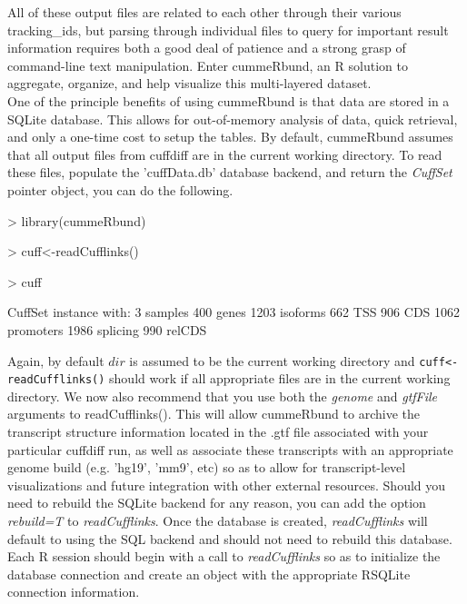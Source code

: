 \documentclass[10pt]{article}
\newcommand{\code}[1]{{\texttt{#1}}}
\newcommand{\Rclass}[1]{{\textit{#1}}}
\newcommand{\Rmethod}[1]{{\textit{#1}}}
\newcommand{\Rfunarg}[1]{{\textit{#1}}}
\begin{document}
All of these output files are related to each other through their various tracking\_ids, but parsing through individual files to query for important result information requires both a good deal of patience and a strong grasp of command-line text manipulation. Enter cummeRbund, an R solution to aggregate, organize, and help visualize this multi-layered dataset. \\
One of the principle benefits of using cummeRbund is that data are stored in a SQLite database.  This allows for out-of-memory analysis of data, quick retrieval, and only a one-time cost to setup the tables. By default, cummeRbund assumes that all output files from cuffdiff are in the current working directory.
To read these files, populate the 'cuffData.db' database backend, and return the \Rclass{CuffSet} pointer object, you can do the following. 

\begin{Schunk}
\begin{Sinput}
> library(cummeRbund)
\end{Sinput}
\end{Schunk}

\begin{Schunk}
\begin{Sinput}
> cuff<-readCufflinks()
\end{Sinput}
\end{Schunk}

\begin{Schunk}
\begin{Sinput}
> cuff
\end{Sinput}
\begin{Soutput}
CuffSet instance with:
	 3 samples
	 400 genes
	 1203 isoforms
	 662 TSS
	 906 CDS
	 1062 promoters
	 1986 splicing
	 990 relCDS
\end{Soutput}
\end{Schunk}

Again, by default $dir$ is assumed to be the current working directory and \code{cuff<-readCufflinks()} should work if all appropriate files are in the current working directory. We now also
recommend that you use both the \Rfunarg{genome} and \Rfunarg{gtfFile} arguments to readCufflinks(). This will allow cummeRbund to archive the transcript structure information located in the .gtf file associated with
your particular cuffdiff run, as well as associate these transcripts with an appropriate genome build (e.g. 'hg19', 'mm9', etc) so as to allow for transcript-level visualizations and future integration with other external resources. 
Should you need to rebuild the SQLite backend for any reason, you can add the option \Rfunarg{rebuild=T} to \Rmethod{readCufflinks}.  Once the database is created, \Rmethod{readCufflinks} will default to using the SQL backend and should not need to rebuild this database.
Each R session should begin with a call to \Rmethod{readCufflinks} so as to initialize the database connection and create an object with the appropriate RSQLite connection information. 
\end{document}
